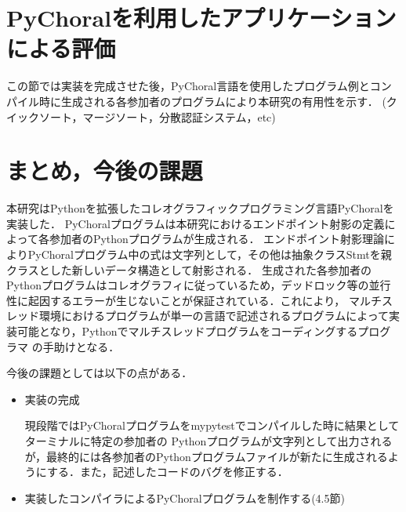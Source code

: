 \documentclass{thesis}
\begin{document}
\chapter{PyChoralを利用したアプリケーションによる評価}
この節では実装を完成させた後，PyChoral言語を使用したプログラム例とコンパイル時に生成される各参加者のプログラムにより本研究の有用性を示す．
(クイックソート，マージソート，分散認証システム，etc)

\chapter{まとめ，今後の課題}
本研究はPythonを拡張したコレオグラフィックプログラミング言語PyChoralを実装した．
PyChoralプログラムは本研究におけるエンドポイント射影の定義によって各参加者のPythonプログラムが生成される．
エンドポイント射影理論によりPyChoralプログラム中の式は文字列として，その他は抽象クラス\textsf{Stmt}を親クラスとした新しいデータ構造として射影される．
生成された各参加者のPythonプログラムはコレオグラフィに従っているため，デッドロック等の並行性に起因するエラーが生じないことが保証されている．これにより，
マルチスレッド環境におけるプログラムが単一の言語で記述されるプログラムによって実装可能となり，Pythonでマルチスレッドプログラムをコーディングするプログラマ
の手助けとなる．

今後の課題としては以下の点がある．
\begin{itemize}
  \item 実装の完成
  
  現段階ではPyChoralプログラムをmypytestでコンパイルした時に結果としてターミナルに特定の参加者の
  Pythonプログラムが文字列として出力されるが，最終的には各参加者のPythonプログラムファイルが新たに生成されるようにする．また，記述したコードのバグを修正する．
  \item 実装したコンパイラによるPyChoralプログラムを制作する(4.5節)
    
\end{itemize}





\appendix
\end{document}
